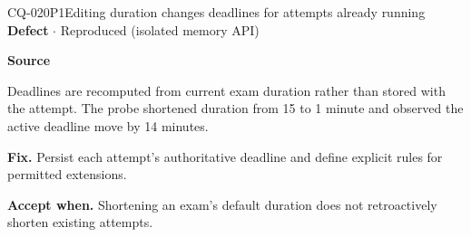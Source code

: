 \begin{finding}{CQ-020}{P1}{Editing duration changes deadlines for attempts already running}
\textbf{Defect} $\cdot$ Reproduced (isolated memory API)\par
\textbf{Source}\quad{}\par
Deadlines are recomputed from current exam duration rather than stored with the attempt. The probe shortened duration from 15 to 1 minute and observed the active deadline move by 14 minutes.\par
\textbf{Fix.} Persist each attempt's authoritative deadline and define explicit rules for permitted extensions.\par
\textbf{Accept when.} Shortening an exam's default duration does not retroactively shorten existing attempts.
\end{finding}
\clearpage
